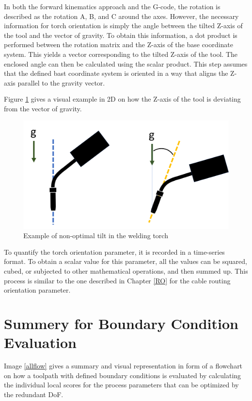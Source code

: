In both the forward kinematics approach and the G-code, the rotation is described as the rotation A, B, and C around the axes. However, the necessary information for torch orientation is simply the angle between the tilted Z-axis of the tool and the vector of gravity. To obtain this information, a dot product is performed between the rotation matrix and the Z-axis of the base coordinate system. This yields a vector corresponding to the tilted Z-axis of the tool. The enclosed angle can then be calculated using the scalar product. This step assumes that the defined bast coordinate system is oriented in a way that aligns the Z-axis parallel to the gravity vector.

Figure \ref{tilt} gives a visual example in 2D on how the Z-axis of the tool is deviating from the vector of gravity.

\begin{figure}[H]
	\centerline{\includegraphics[width=.5\textwidth]{figures/ttilt.png}}
	\caption{Example of non-optimal tilt in the welding torch}
	\label{tilt}
\end{figure}

To quantify the torch orientation parameter, it is recorded in a time-series format. To obtain a scalar value for this parameter, all the values can be squared, cubed, or subjected to other mathematical operations, and then summed up. This process is similar to the one described in Chapter \ref{RO} for the cable routing orientation parameter.


\newpage
\section{Summery for Boundary Condition Evaluation}



Image \ref{allflow} gives a summary and visual representation in form of a flowchart on how a toolpath with defined boundary conditions is evaluated by calculating the individual local scores for the process parameters that can be optimized by the redundant DoF.

